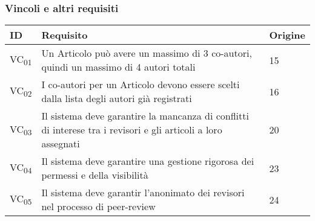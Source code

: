 \subsubsection{Vincoli e altri requisiti}
\label{sec:vincoli}
\begin{tabular}{|p{1cm}|p{9cm}|p{1cm}|}
  \hline
  \rowcolor{SkyBlue}
  ID & Requisito & Origine \\
  \hline
  \hline
  VC\textsubscript{01} & Un Articolo può avere un massimo di 3 co-autori, quindi un massimo di 4 autori totali & 15 \\
  \hline
  VC\textsubscript{02} &  I co-autori per un Articolo devono essere scelti dalla lista degli autori già registrati & 16 \\
  \hline
  VC\textsubscript{03} & Il sistema deve garantire la mancanza di conflitti di interese tra i revisori e gli articoli a loro assegnati & 20 \\
  \hline
  VC\textsubscript{04} & Il sistema deve garantire una gestione rigorosa dei permessi e della visibilità & 23 \\
  \hline
  VC\textsubscript{05} & Il sistema deve garantir l'anonimato dei revisori nel processo di peer-review & 24 \\
  \hline
\end{tabular}



